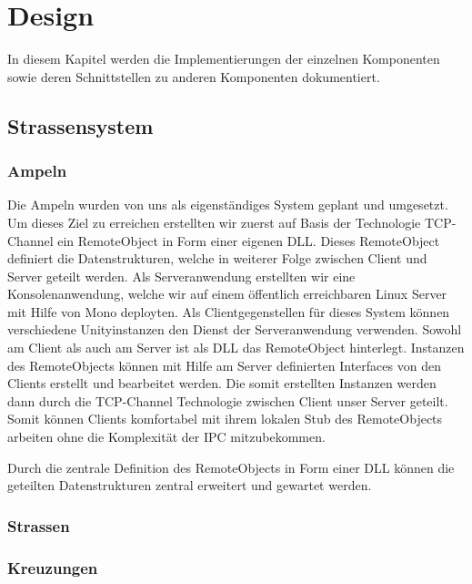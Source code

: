 
\chapter{Design}
\label{Design}

In diesem Kapitel werden die Implementierungen der einzelnen Komponenten sowie deren Schnittstellen zu anderen Komponenten dokumentiert.

\thispagestyle{standard}
\pagestyle{standard}

\section{Strassensystem}
\label{Strassensystem}

\subsection{Ampeln}

Die Ampeln wurden von uns als eigenständiges System geplant und umgesetzt. Um dieses Ziel zu erreichen erstellten wir zuerst auf Basis der Technologie TCP-Channel ein RemoteObject in Form einer eigenen DLL. Dieses RemoteObject definiert die Datenstrukturen, welche in weiterer Folge zwischen Client und Server geteilt werden. Als Serveranwendung erstellten wir eine Konsolenanwendung, welche wir auf einem öffentlich erreichbaren Linux Server mit Hilfe von Mono deployten. Als Clientgegenstellen für dieses System können verschiedene Unityinstanzen den Dienst der Serveranwendung verwenden. Sowohl am Client als auch am Server ist als DLL das RemoteObject hinterlegt. Instanzen des RemoteObjects können mit Hilfe am Server definierten Interfaces von den Clients erstellt und bearbeitet werden. Die somit erstellten Instanzen werden dann durch die TCP-Channel Technologie zwischen Client unser Server geteilt. Somit können Clients komfortabel mit ihrem lokalen Stub des RemoteObjects arbeiten ohne die Komplexität der IPC mitzubekommen. 

Durch die zentrale Definition des RemoteObjects in Form einer DLL können die geteilten Datenstrukturen zentral erweitert und gewartet werden.

\subsection{Strassen}

\subsection{Kreuzungen}

